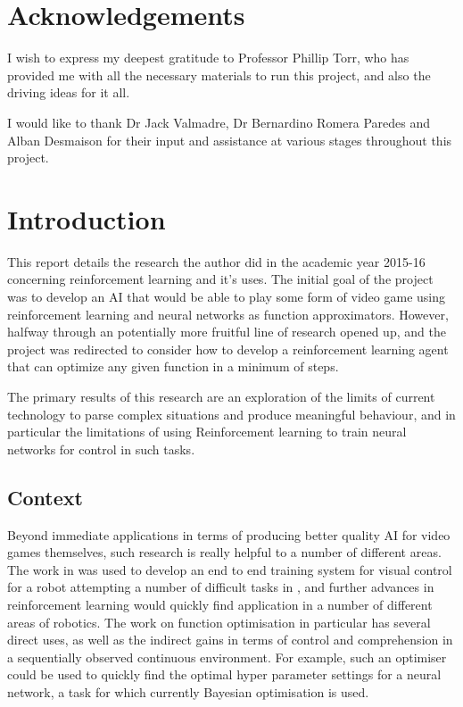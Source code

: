 \section{Acknowledgements}
I wish to express my deepest gratitude to Professor Phillip Torr, who has provided me with all the necessary materials to run this project, and also the driving ideas for it all.

I would like to thank Dr Jack Valmadre, Dr Bernardino Romera Paredes and Alban Desmaison
for their input and assistance at various stages throughout this project.
\section{Introduction}
This report details the research the author did in the academic year 2015-16 concerning reinforcement learning and it's uses. The initial goal of the project was to develop an AI that would be able to play some form of video game using reinforcement learning and neural networks as function approximators. However, halfway through an potentially more fruitful line of research opened up, and the project was redirected to consider how to develop a reinforcement learning agent that can optimize any given function in a minimum of steps.

The primary results of this research are an exploration of the limits of current technology to parse complex situations and produce meaningful behaviour, and in particular the limitations of using Reinforcement learning to train neural networks for control in such tasks.

\subsection{Context}
Beyond immediate applications in terms of producing better quality AI for video games themselves, such research is really helpful to a number of different areas. The work in \cite{atariDQN} was used to develop an end to end training system for visual control for a robot attempting a number of difficult tasks in \cite{levine2015end}, and further advances in reinforcement learning would quickly find application in a number of different areas of robotics. The work on function optimisation in particular has several direct uses, as well as the indirect gains in terms of control and comprehension in a sequentially observed continuous environment. For example, such an optimiser could be used to quickly find the optimal hyper parameter settings for  a neural network, a task for which currently Bayesian optimisation is used.

